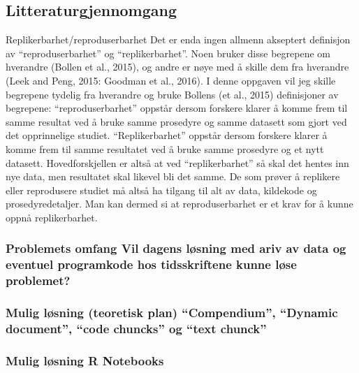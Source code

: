 \documentclass[
]{article}
\begin{document}
\hypertarget{litteraturgjennomgang}{%
\subsection{Litteraturgjennomgang}\label{litteraturgjennomgang}}

Replikerbarhet/reproduserbarhet Det er enda ingen allmenn akseptert
definisjon av ``reproduserbarhet'' og ``replikerbarhet''. Noen bruker
disse begrepene om hverandre (Bollen et al., 2015), og andre er nøye med
å skille dem fra hverandre (Leek and Peng, 2015: Goodman et al., 2016).
I denne oppgaven vil jeg skille begrepene tydelig fra hverandre og bruke
Bollens (et al., 2015) definisjoner av begrepene: ``reproduserbarhet''
oppstår dersom forskere klarer å komme frem til samme resultat ved å
bruke samme prosedyre og samme datasett som gjort ved det opprinnelige
studiet. ``Replikerbarhet'' oppstår dersom forskere klarer å komme frem
til samme resultatet ved å bruke samme prosedyre og et nytt datasett.
Hovedforskjellen er altså at ved ``replikerbarhet'' så skal det hentes
inn nye data, men resultatet skal likevel bli det samme. De som prøver å
replikere eller reprodusere studiet må altså ha tilgang til alt av data,
kildekode og prosedyredetaljer. Man kan dermed si at reproduserbarhet er
et krav for å kunne oppnå replikerbarhet.

\hypertarget{problemets-omfang-vil-dagens-luxf8sning-med-ariv-av-data-og-eventuel-programkode-hos-tidsskriftene-kunne-luxf8se-problemet}{%
\subsubsection{Problemets omfang Vil dagens løsning med ariv av data og
eventuel programkode hos tidsskriftene kunne løse
problemet?}\label{problemets-omfang-vil-dagens-luxf8sning-med-ariv-av-data-og-eventuel-programkode-hos-tidsskriftene-kunne-luxf8se-problemet}}

\hypertarget{mulig-luxf8sning-teoretisk-plan-compendium-dynamic-document-code-chuncks-og-text-chunck}{%
\subsubsection{Mulig løsning (teoretisk plan) ``Compendium'', ``Dynamic
document'', ``code chuncks'' og ``text
chunck''}\label{mulig-luxf8sning-teoretisk-plan-compendium-dynamic-document-code-chuncks-og-text-chunck}}

\hypertarget{mulig-luxf8sning-r-notebooks}{%
\subsubsection{Mulig løsning R
Notebooks}\label{mulig-luxf8sning-r-notebooks}}
\end{document}
